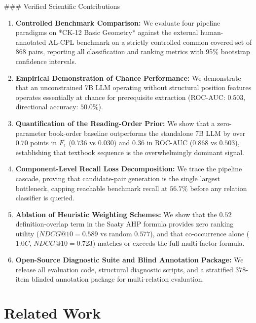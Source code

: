 \documentclass[11pt,a4paper]{article}
\begin{document}
### Verified Scientific Contributions
\begin{enumerate}[leftmargin=*,itemsep=2pt]
  \item \textbf{Controlled Benchmark Comparison:} We evaluate four pipeline paradigms on *CK-12 Basic Geometry* against the external human-annotated AL-CPL benchmark on a strictly controlled common covered set of 868 pairs, reporting all classification and ranking metrics with 95\% bootstrap confidence intervals.
  \item \textbf{Empirical Demonstration of Chance Performance:} We demonstrate that an unconstrained 7B LLM operating without structural position features operates essentially at chance for prerequisite extraction (ROC-AUC: $0.503$, directional accuracy: $50.0\%$).
  \item \textbf{Quantification of the Reading-Order Prior:} We show that a zero-parameter book-order baseline outperforms the standalone 7B LLM by over $0.70$ points in $F_1$ ($0.736$ vs $0.030$) and $0.36$ in ROC-AUC ($0.868$ vs $0.503$), establishing that textbook sequence is the overwhelmingly dominant signal.
  \item \textbf{Component-Level Recall Loss Decomposition:} We trace the pipeline cascade, proving that candidate-pair generation is the single largest bottleneck, capping reachable benchmark recall at $56.7\%$ before any relation classifier is queried.
  \item \textbf{Ablation of Heuristic Weighting Schemes:} We show that the $0.52$ definition-overlap term in the Saaty AHP formula provides zero ranking utility ($NDCG@10 = 0.589$ vs random $0.577$), and that co-occurrence alone ($1.0 C$, $NDCG@10 = 0.723$) matches or exceeds the full multi-factor formula.
  \item \textbf{Open-Source Diagnostic Suite and Blind Annotation Package:} We release all evaluation code, structural diagnostic scripts, and a stratified 378-item blinded annotation package for multi-relation evaluation.
\end{enumerate}

\section{Related Work}
\end{document}

